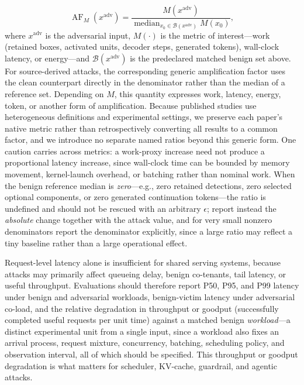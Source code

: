 \documentclass[acmsmall,screen,review,nonacm]{acmart}
\begin{document}
\begin{equation}
\operatorname{AF}_{M}(x^{\mathrm{adv}})=\frac{M(x^{\mathrm{adv}})}{\operatorname{median}_{x_0\in\mathcal{B}(x^{\mathrm{adv}})} M(x_0)},
\end{equation}
where $x^{\mathrm{adv}}$ is the adversarial input, $M(\cdot)$ is the metric of interest---work (retained boxes, activated units, decoder steps, generated tokens), wall-clock latency, or energy---and $\mathcal{B}(x^{\mathrm{adv}})$ is the predeclared matched benign set above. For source-derived attacks, the corresponding generic amplification factor uses the clean counterpart directly in the denominator rather than the median of a reference set. Depending on $M$, this quantity expresses work, latency, energy, token, or another form of amplification. Because published studies use heterogeneous definitions and experimental settings, we preserve each paper's native metric rather than retrospectively converting all results to a common factor, and we introduce no separate named ratios beyond this generic form. One caution carries across metrics: a work-proxy increase need not produce a proportional latency increase, since wall-clock time can be bounded by memory movement, kernel-launch overhead, or batching rather than nominal work. When the benign reference median is \emph{zero}---e.g., zero retained detections, zero selected optional components, or zero generated continuation tokens---the ratio is undefined and should not be rescued with an arbitrary $\epsilon$; report instead the \emph{absolute} change together with the attack value, and for very small nonzero denominators report the denominator explicitly, since a large ratio may reflect a tiny baseline rather than a large operational effect.

Request-level latency alone is insufficient for shared serving systems, because attacks may primarily affect queueing delay, benign co-tenants, tail latency, or useful throughput. Evaluations should therefore report P50, P95, and P99 latency under benign and adversarial workloads, benign-victim latency under adversarial co-load, and the relative degradation in throughput or goodput (successfully completed useful requests per unit time) against a matched benign \emph{workload}---a distinct experimental unit from a single input, since a workload also fixes an arrival process, request mixture, concurrency, batching, scheduling policy, and observation interval, all of which should be specified. This throughput or goodput degradation is what matters for scheduler, KV-cache, guardrail, and agentic attacks.
\end{document}
